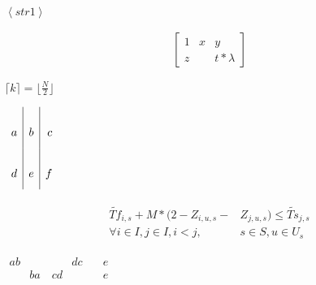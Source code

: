 \documentclass{article}
\begin{document}



    $\left\langle str1 \right\rangle$

    \begin{align}
        \left[
        \begin{matrix}
            1 & x & y\\
            z & & t*\lambda
        \end{matrix}    
        \right]
    \end{align}

    $\lceil k \rceil = \lfloor\frac{N}{2}\rfloor$



    $\def\arraystretch{3}
    \begin{array}{l|c|r}
        a & b & c\\
        d & e & f
    \end{array}$    

    \begin{align}
        \begin{split}
            \widetilde{Tf}_{i,s} + M*(2-Z_{i,u,s}-&Z_{j,u,s}) \leq 
            \widetilde{Ts}_{j,s} \\
            \forall i \in I, j \in I, i < j,& s \in S, u \in U_{s}    
        \end{split}
    \end{align}

    $\begin{alignedat}{3}
        ab& &dc \quad &e\\
        &ba \quad cd& &e
    \end{alignedat}$
\end{document}
